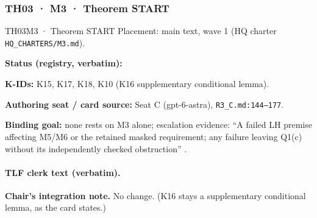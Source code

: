 \subsubsection{TH03 · M3 · Theorem START}\label{sec:th03}
\begin{card}{TH03}{M3 · Theorem START}
\approvedFB\quad Placement: main text, wave 1 (HQ charter \texttt{HQ\_CHARTERS/M3.md}).\par
\textbf{Status (registry, verbatim):} \par
\textbf{K-IDs:} K15, K17, K18, K10 (K16 supplementary conditional lemma).\par
\textbf{Authoring seat / card source:} Seat C (gpt-6-astra), \texttt{R3\_C.md:144–177}.\par
\textbf{Binding goal:} none rests on M3 alone; escalation evidence: ``A failed LH premise affecting M5/M6 or the retained masked requirement; any failure leaving Q1(c) without its independently checked obstruction'' .
\end{card}

\paragraph{TLF clerk text (verbatim).}
\par\noindent \textbf{Chair's integration note.} No change. (K16 stays a supplementary conditional lemma, as the card states.)

